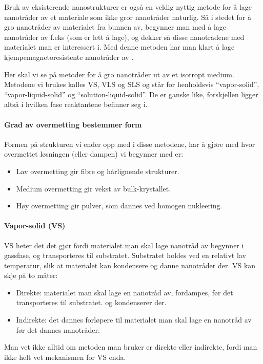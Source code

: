 Bruk av eksisterende nanostrukturer er også en veldig nyttig metode for å lage nanotråder av et materiale som ikke gror nanotråder naturlig. Så i stedet for å gro nanotråder av materialet fra bunnen av, begynner man med å lage nanotråder av f.eks  (som er lett å lage), og dekker så disse nanotrådene med materialet man er interessert i. Med denne metoden har man klart å lage kjempemagnetoresistente nanotråder av .

Her skal vi se på metoder for å gro nanotråder ut av et isotropt medium. Metodene vi brukes kalles VS, VLS og SLS og står for henholdsvis ``vapor-solid'', ``vapor-liquid-solid'' og ``solution-liquid-solid''. De er ganske like, forskjellen ligger altså i hvilken fase reaktantene befinner seg i.

\paragraph{Grad av overmetting bestemmer form} Formen på strukturen vi ender opp med i disse metodene, har å gjøre med hvor overmettet løsningen (eller dampen) vi begynner med er:
\begin{itemize}
	\item Lav overmetting gir fibre og hårlignende strukturer.
	\item Medium overmetting gir vekst av bulk-krystallet.
	\item Høy overmetting gir pulver, som dannes ved homogen nukleering.
\end{itemize}

\paragraph{Vapor-solid (VS)} VS heter det det gjør fordi materialet man skal lage nanotråd av begynner i gassfase, og transporteres til substratet. Substratet holdes ved en relativt lav temperatur, slik at materialet kan kondensere og danne nanotråder der. VS kan skje på to måter:
\begin{itemize}
	\item Direkte: materialet man skal lage en nanotråd av, fordampes, før det transporteres til substratet. og kondenserer der.
	\item Indirekte: det dannes forløpere til materialet man skal lage en nanotråd av før det dannes nanotråder.
\end{itemize}
Man vet ikke alltid om metoden man bruker er direkte eller indirekte, fordi man ikke helt vet mekanismen for VS enda.

